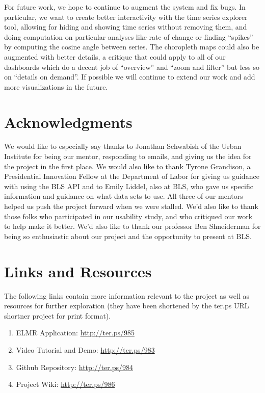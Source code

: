 \documentclass{sigchi}
\begin{document}
For future work, we hope to continue to augment the system and fix bugs. In particular, we want to create better interactivity with the time series explorer tool, allowing for hiding and showing time series without removing them, and doing computation on particular analyses like rate of change or finding ``spikes'' by computing the cosine angle between series. The choropleth maps could also be augmented with better details, a critique that could apply to all of our dashboards which do a decent job of ``overview'' and ``zoom and filter'' but less so on ``details on demand''. If possible we will continue to extend our work and add more visualizations in the future.

\section{Acknowledgments}

We would like to especially say thanks to Jonathan Schwabish of the Urban Institute for being our mentor, responding to emails, and giving us the idea for the project in the first place. We would also like to thank Tyrone Grandison, a Presidential Innovation Fellow at the Department of Labor for giving us guidance with using the BLS API and to Emily Liddel, also at BLS, who gave us specific information and guidance on what data sets to use. All three of our mentors helped us push the project forward when we were stalled. We'd also like to thank those folks who participated in our usability study, and who critiqued our work to help make it better. We'd also like to thank our professor Ben Shneiderman for being so enthusiastic about our project and the opportunity to present at BLS.

\section{Links and Resources}

The following links contain more information relevant to the project as well as resources for further exploration (they have been shortened by the ter.ps URL shortner project for print format).

\begin{enumerate}
    \item ELMR Application: \url{http://ter.ps/985}
    \item Video Tutorial and Demo: \url{http://ter.ps/983}
    \item Github Repository: \url{http://ter.ps/984}
    \item Project Wiki: \url{http://ter.ps/986}
\end{enumerate}
\end{document}
